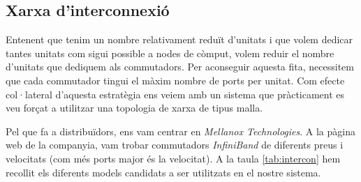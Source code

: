 \subsection{Xarxa d'interconnexió}

Entenent que tenim un nombre relativament reduït d'unitats i que volem dedicar tantes unitats com 
sigui possible a nodes de còmput, volem reduir el nombre d'unitats que dediquem als commutadors. Per aconseguir aquesta fita, necessitem que cada commutador tingui el màxim
nombre de ports per unitat.
Com efecte col·lateral d'aquesta estratègia ens veiem amb un sistema que pràcticament es veu forçat a utilitzar una topologia de xarxa de tipus malla.

Pel que fa a distribuïdors, ens vam centrar en \textit{Mellanox Technologies}. A la pàgina web
\cite{mellanox-web} de la companyia, vam trobar commutadors \textit{InfiniBand} de diferents preus
i velocitats (com més ports major és la velocitat). A la taula \ref{tab:intercon} hem recollit els 
diferents models candidats a ser utilitzats en el nostre sistema.

\begin{table}[h]
\begin{adjustwidth}{-.5in}{-.5in}  
    \begin{center}
        \centering
    \caption{Comparació entre els diferents commutadors.}
    \label{tab:intercon}
    \end{center}
\end{adjustwidth}
\end{table}

